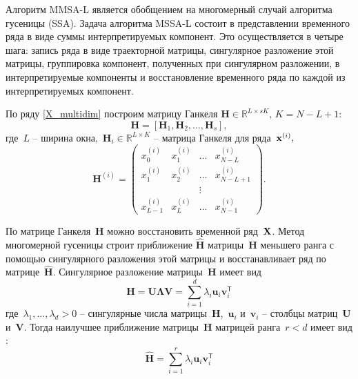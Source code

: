 \documentclass[14pt]{article}
\begin{document}
Алгоритм MMSA-L является обобщением на многомерный случай алгоритма гусеницы (SSA). Задача алгоритма MSSA-L состоит в представлении временного ряда в виде суммы интерпретируемых компонент. 
Это осуществляется в четыре шага: запись ряда в виде траекторной матрицы, сингулярное разложение этой матрицы, группировка компонент, полученных при сингулярном разложении, в интерпретируемые компоненты и восстановление временного ряда по каждой из интерпретируемых компонент. 


По ряду \eqref{X_multidim} построим матрицу Ганкеля $\mathbf{H} \in \mathbb{R}^{L \times sK}, \, K = N - L + 1$:
$$\mathbf{H} = [\mathbf{H}_{1}, \mathbf{H}_{2}, \ldots, \mathbf{H}_{s}],$$
где~$L$ -- ширина окна,~$\mathbf{H}_{i} \in \mathbb{R}^{L \times K}$ -- матрица Ганкеля для ряда~${\bf x}^{(i)},$
$$\mathbf{H}^{(i)} = \begin{pmatrix}
x^{(i)}_{0} & x^{(i)}_{1} &\ldots & x^{(i)}_{N - L} \\
x^{(i)}_{1} & x^{(i)}_{2} &\ldots & x^{(i)}_{N - L + 1} \\ 
&&\vdots& \\ 
x^{(i)}_{L - 1} & x^{(i)}_{L} &\ldots & x^{(i)}_{N - 1}
\end{pmatrix}.$$

По матрице Ганкеля~$\mathbf{H}$ можно восстановить временной ряд~${\bf X}$. 
Метод многомерной гусеницы строит 
приближение $\hat{\mathbf{H}}$ матрицы~$\mathbf{H}$ меньшего ранга с помощью сингулярного разложения этой матрицы и восстанавливает ряд по матрице~$\hat{\mathbf{H}}$.
Сингулярное разложение матрицы~$\mathbf{H}$ имеет вид
$$\mathbf{H} = \mathbf{U}\mathbf{\Lambda} \mathbf{V} = \sum_{i = 1}^{d}{\lambda_i \mathbf{u}_i\mathbf{v}_i^{\mathsf{T}}}$$
где~$\lambda_1, \ldots, \lambda_d > 0$ -- сингулярные числа матрицы~$\mathbf{H}$,~$\mathbf{u}_i$ и~$\mathbf{v}_i$ -- столбцы матриц~$\mathbf{U}$ и~$\mathbf{V}$.
Тогда наилучшее приближение матрицы~$\mathbf{H}$ матрицей ранга~$r < d$ имеет вид : 
$$\hat{\mathbf{H}} = \sum_{i = 1}^{r}{\lambda_i \mathbf{u}_i \mathbf{v}_i^{\mathsf{T}}}$$
\end{document}
